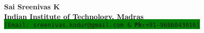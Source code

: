 \documentclass[letterpaper,11pt]{article}
\begin{document}
%

\begin{minipage}[c]{0.5\textwidth}
\begin{flushleft}
	\textbf{{\LARGE Sai Sreenivas K}} \\
	\textbf{Indian Institute of Technology, Madras} \\
	{\footnotesize \texttt{\colorbox{green}{[Email: sreenivas.kodur@gmail.com \& \textbf{Ph:}+91-9686043016]}}} \\
\end{flushleft}
%
\end{minipage}
\end{document}
